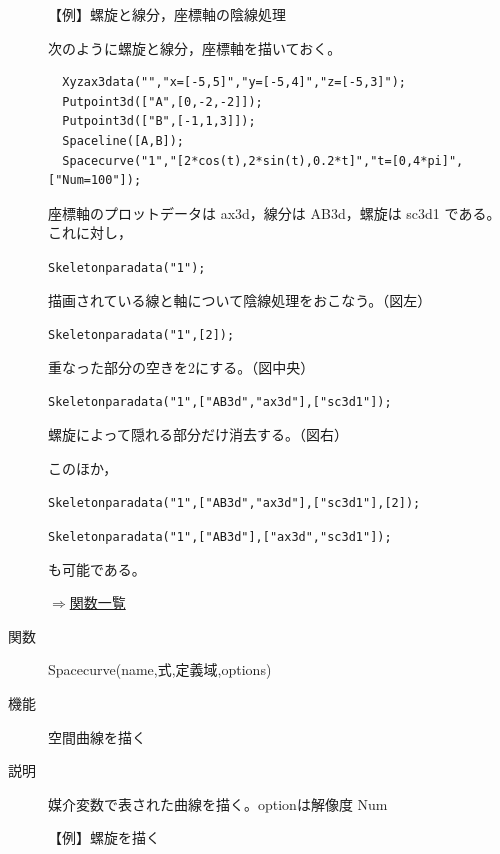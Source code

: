 \documentclass[papersize,a4paper,12pt,uplatex]{jsarticle}
\begin{document}
\begin{description}
\vspace{\baselineskip}
【例】螺旋と線分，座標軸の陰線処理

次のように螺旋と線分，座標軸を描いておく。
\begin{verbatim}
  Xyzax3data("","x=[-5,5]","y=[-5,4]","z=[-5,3]");
  Putpoint3d(["A",[0,-2,-2]]);
  Putpoint3d(["B",[-1,1,3]]);
  Spaceline([A,B]);
  Spacecurve("1","[2*cos(t),2*sin(t),0.2*t]","t=[0,4*pi]",["Num=100"]);
\end{verbatim}
座標軸のプロットデータは ax3d，線分は AB3d，螺旋は sc3d1 である。これに対し，

\hspace{10mm} \verb|Skeletonparadata("1");|

 描画されている線と軸について陰線処理をおこなう。（図左）

\hspace{10mm} \verb|Skeletonparadata("1",[2]);|

 重なった部分の空きを2にする。（図中央）
 
\hspace{10mm} \verb|Skeletonparadata("1",["AB3d","ax3d"],["sc3d1"]);|
  
螺旋によって隠れる部分だけ消去する。（図右）

\begin{center}     
  \end{center}

このほか，

\hspace{10mm} \verb|Skeletonparadata("1",["AB3d","ax3d"],["sc3d1"],[2]);|

\hspace{10mm} \verb|Skeletonparadata("1",["AB3d"],["ax3d","sc3d1"]);|

も可能である。

\begin{flushright} \hyperlink{functionlist}{$\Rightarrow$関数一覧}\end{flushright}
\vspace{\baselineskip}

\hypertarget{spacecurve}{}
\item[関数]  Spacecurve(name,式,定義域,options)
\item[機能]  空間曲線を描く
\item[説明]  媒介変数で表された曲線を描く。optionは解像度 Num

\vspace{\baselineskip}
【例】螺旋を描く


\end{description}
\end{document}
